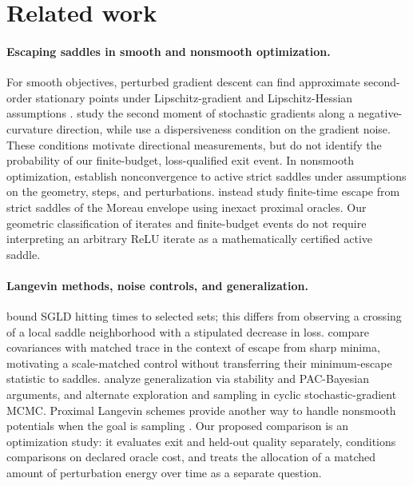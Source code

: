 \documentclass[11pt]{article}
\begin{document}
\section{Related work}

\paragraph{Escaping saddles in smooth and nonsmooth optimization.}
For smooth objectives, perturbed gradient descent can find approximate
second-order stationary points under Lipschitz-gradient and
Lipschitz-Hessian assumptions \citep{jin2017}. \citet{daneshmand2018} study
the second moment of stochastic gradients along a negative-curvature
direction, while \citet{fang2019} use a dispersiveness condition on the
gradient noise. These conditions motivate directional measurements, but do
not identify the probability of our finite-budget, loss-qualified exit
event. In nonsmooth optimization, \citet{bianchi2023} establish
nonconvergence to active strict saddles under assumptions on the geometry,
steps, and perturbations. \citet{davis2021} instead study finite-time escape
from strict saddles of the Moreau envelope using inexact proximal oracles.
Our geometric classification of iterates and finite-budget events do
not require interpreting an arbitrary ReLU iterate as a mathematically
certified active saddle.

\paragraph{Langevin methods, noise controls, and generalization.}
\citet{zhang2017} bound SGLD hitting times to selected sets; this differs
from observing a crossing of a local saddle neighborhood with a stipulated
decrease in loss. \citet{zhu2019} compare covariances with matched trace in
the context of escape from sharp minima, motivating a scale-matched control
without transferring their minimum-escape statistic to saddles.
\citet{mou2017} analyze generalization via stability and PAC-Bayesian
arguments, and \citet{zhang2020} alternate exploration and sampling in
cyclic stochastic-gradient MCMC. Proximal Langevin schemes provide another
way to handle nonsmooth potentials when the goal is sampling
\citep{durmus2016,renaud2025}. Our proposed comparison is an optimization
study: it evaluates exit and held-out quality separately, conditions
comparisons on declared oracle cost, and treats the allocation of a
matched amount of perturbation energy over time as a separate question.
\end{document}
